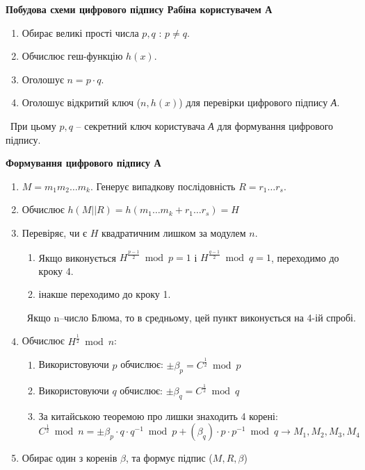 \begin{center}
\textbf{Побудова схеми цифрового підпису Рабіна користувачем А}
\end{center}

\begin{enumerate}
        \item Обирає великі прості числа $p,q$ : $p\ne q$.
        \item Обчислює геш-функцію $h(x)$.
        \item Оголошує $n=p \cdot q$.
        \item Оголошує відкритий ключ ($n, h(x)$) для перевірки цифрового підпису \textsl{А}.     
\end{enumerate}
\ При цьому $p,q$ -- секретний ключ користувача \textsl{А} для формування цифрового підпису.

\begin{center}
\textbf{Формування цифрового підпису А}
\end{center}

\begin{enumerate}
        \item   $M =m_1m_2…m_k$. Генерує випадкову послідовність $R=r_1…r_s$.
        \item   Обчислює $h(M||R)=h(m_1…m_k+r_1…r_s)=H$
        \item Перевіряє, чи є $H$ квадратичним лишком за модулем $n$.
        \begin{enumerate}
                \item Якщо виконується $H^{\frac{p-1}{2}}\bmod p=1$ і $H^{\frac{q-1}{2}}\bmod q=1$, переходимо до кроку 4.
                \item інакше переходимо до кроку 1.
        \end{enumerate}
\ Якщо n--число Блюма, то в средньому, цей пункт виконується на 4-ій спробі.
    \item       Обчислює $H^{\frac{1}{2}}\bmod n$:
    \begin{enumerate}
    \item       Використовуючи $p$ обчислює: $\pm \beta_p=C^{\frac{1}{2}}\bmod p$
    \item Використовуючи $q$ обчислює: $\pm \beta_q=C^{\frac{1}{2}}\bmod q$
    \item   За китайською теоремою про лишки знаходить 4 корені: 
\[    
    C^{\frac{1}{2}}\bmod n={\pm \beta_p \cdot q \cdot q^{-1}\bmod p + ( \beta_q) \cdot p \cdot p^{-1}\bmod q} \rightarrow M_1,M_2,M_3,M_4
\]
\end{enumerate}
   \item Обирає один з коренів $\beta$, та формує підпис ($M,R, \beta$)
\end{enumerate}

